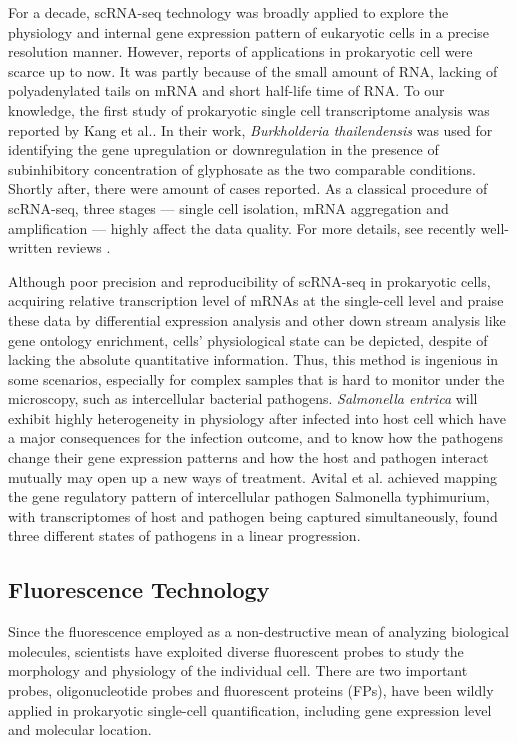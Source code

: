 \documentclass[fleqn,10pt]{wlscirep}
\begin{document}
For a decade, scRNA-seq technology was broadly applied to explore the physiology and internal gene expression pattern of eukaryotic cells in a precise resolution manner. However, reports of applications in prokaryotic cell were scarce up to now. It was partly because of the small amount of RNA, lacking of polyadenylated tails on mRNA and short half-life time of RNA\cite{Zhang2018}. To our knowledge, the first study of prokaryotic single cell transcriptome analysis was reported by Kang et al.\cite{Kang2011,Kang2015}. In their work, \emph{Burkholderia thailendensis} was used for identifying the gene upregulation or downregulation in the presence of subinhibitory concentration of glyphosate as the two comparable conditions. Shortly after, there were amount of cases reported. As a classical procedure of scRNA-seq, three stages --- single cell isolation\cite{Klein2015}, mRNA aggregation\cite{Kang2011} and amplification\cite{Kurn2005, Wang2015, Chen2017, Baugh2001} --- highly affect the data quality. For more details, see recently well-written reviews \cite{Zhang2018, Chen2017,  Svensson2018}. 

Although poor precision and reproducibility of scRNA-seq in prokaryotic cells, acquiring relative transcription level of mRNAs at the single-cell level and praise these data by differential expression analysis and other down stream analysis like gene ontology enrichment, cells' physiological state can be depicted, despite of lacking the absolute quantitative information. Thus, this method is ingenious in some scenarios, especially for complex samples that is hard to monitor under the microscopy, such as intercellular bacterial pathogens. \emph{Salmonella entrica} will exhibit highly heterogeneity in physiology after infected into host cell which have a major consequences for the infection outcome, and to know how the pathogens change their gene expression patterns and how the host and pathogen interact mutually may open up a new ways of treatment\cite{Avital2017, Saliba2016}. Avital et al.\cite{Avital2017} achieved mapping the gene regulatory pattern of intercellular pathogen Salmonella typhimurium, with transcriptomes of host and pathogen being captured simultaneously, found three different states of pathogens in a linear progression.

\subsection{Fluorescence Technology}

Since the fluorescence employed as a non-destructive mean of analyzing biological molecules, scientists have exploited diverse fluorescent probes to study the morphology and physiology of the individual cell\cite{Brehm-Stecher2004}. There are two important probes, oligonucleotide probes and fluorescent proteins (FPs), have been wildly applied in prokaryotic single-cell quantification, including gene expression level and molecular location.
\end{document}
